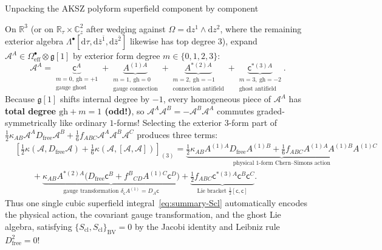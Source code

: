 \documentclass[11pt,letterpaper]{article}
\numberwithin{equation}{section}
\theoremstyle{plain}
\theoremstyle{definition}
\theoremstyle{remark}
\newenvironment{example}[1][]{%
  \begin{examplebox}{#1}{}%
}{%
  \end{examplebox}%
}
\newcommand{\dd}{\mathrm{d}}
\newcommand{\fg}{\mathfrak{g}}
\begin{document}
\begin{example}[Unpacking the AKSZ polyform superfield component by component]
\label{ex:aksz-expansion}
On $\mathbb{R}^3$ (or on $\mathbb{R}_\tau\times\mathbb{C}^2_z$ after wedging against $\Omega = \dd z^1\wedge\dd z^2$, where the remaining exterior algebra $\Lambda^\bullet[\dd\tau, \dd\bar{z}^{\bar{1}}, \dd\bar{z}^{\bar{2}}]$ likewise has top degree $3$), expand $\mathcal{A}^A \in \Omega^\bullet_{\mathrm{eff}}\otimes\fg[1]$ by exterior form degree $m \in \{0,1,2,3\}$:
\begin{equation}
\label{eq:aksz-components}
\mathcal{A}^A = \underbrace{\mathsf{c}^A}_{\substack{m=0,\ \mathrm{gh}=+1\\\text{gauge ghost}}}
+ \underbrace{A^{(1)A}}_{\substack{m=1,\ \mathrm{gh}=0\\\text{gauge connection}}}
+ \underbrace{A^{*(2)A}}_{\substack{m=2,\ \mathrm{gh}=-1\\\text{connection antifield}}}
+ \underbrace{\mathsf{c}^{*(3)A}}_{\substack{m=3,\ \mathrm{gh}=-2\\\text{ghost antifield}}}.
\end{equation}
Because $\fg[1]$ shifts internal degree by $-1$, every homogeneous piece of $\mathcal{A}^A$ has \textbf{total degree $\mathrm{gh} + m = 1$ (odd!)}, so $\mathcal{A}^A\mathcal{A}^B = -\mathcal{A}^B\mathcal{A}^A$ commutes graded-symmetrically like ordinary $1$-forms! Selecting the exterior $3$-form part of $\frac{1}{2}\kappa_{AB}\mathcal{A}^A D_{\mathrm{free}}\mathcal{A}^B + \frac{1}{6}f_{ABC}\mathcal{A}^A\mathcal{A}^B\mathcal{A}^C$ produces three terms:
\begin{align}
\label{eq:aksz-expanded-action}
&\left[\frac{1}{2}\kappa(\mathcal{A}, D_{\mathrm{free}}\mathcal{A}) + \frac{1}{6}\kappa(\mathcal{A}, [\mathcal{A},\mathcal{A}])\right]_{(3)}
= \underbrace{\frac{1}{2}\kappa_{AB}A^{(1)A} D_{\mathrm{free}} A^{(1)B} + \frac{1}{6}f_{ABC}A^{(1)A}A^{(1)B}A^{(1)C}}_{\text{physical } 1\text{-form Chern--Simons action}} \nonumber\\
&\qquad + \underbrace{\kappa_{AB}A^{*(2)A}\big(D_{\mathrm{free}}\mathsf{c}^B + f^B{}_{CD}A^{(1)C}\mathsf{c}^D\big)}_{\text{gauge transformation }\delta_{\mathsf{c}}A^{(1)} = D_A\mathsf{c}}
+ \underbrace{\frac{1}{2}f_{ABC}\mathsf{c}^{*(3)A}\mathsf{c}^B\mathsf{c}^C}_{\text{Lie bracket }\frac{1}{2}[\mathsf{c},\mathsf{c}]}.
\end{align}
Thus one single cubic superfield integral~\eqref{eq:summary-Scl} automatically encodes the physical action, the covariant gauge transformation, and the ghost Lie algebra, satisfying $\{S_{\mathrm{cl}}, S_{\mathrm{cl}}\}_{\mathrm{BV}} = 0$ by the Jacobi identity and Leibniz rule $D_{\mathrm{free}}^2 = 0$!
\end{example}
\end{document}
